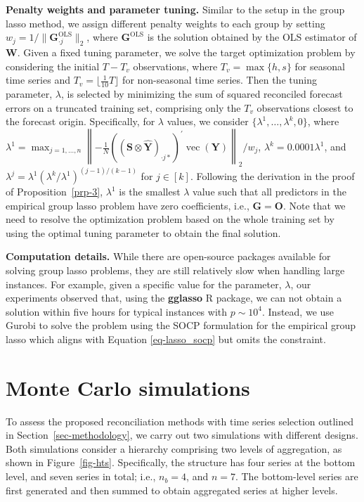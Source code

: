 \documentclass[
  11pt]{article}
\theoremstyle{plain}
\theoremstyle{remark}
\begin{document}
\textbf{Penalty weights and parameter tuning.} Similar to the setup in
the group lasso method, we assign different penalty weights to each
group by setting \(w_j = 1/\|\bm{G}_{\cdot j}^{\text{OLS}}\|_2\), where
\(\bm{G}^{\text{OLS}}\) is the solution obtained by the OLS estimator of
\(\bm{W}\). Given a fixed tuning parameter, we solve the target
optimization problem by considering the initial \(T-T_v\) observations,
where \(T_v = \max\{h, s\}\) for seasonal time series and
\(T_v = \lfloor \frac{1}{10}T \rfloor\) for non-seasonal time series.
Then the tuning parameter, \(\lambda\), is selected by minimizing the
sum of squared reconciled forecast errors on a truncated training set,
comprising only the \(T_v\) observations closest to the forecast origin.
Specifically, for \(\lambda\) values, we consider
\(\{\lambda^{1},\dots,\lambda^{k}, 0\}\), where
\(\lambda^{1} = \max_{j=1, \ldots, n}\left\|-\frac{1}{N}\left(\left(\bm{S} \otimes \hat{\bm{Y}}\right)_{\cdot j*}\right)^{\prime} \operatorname{vec}(\bm{Y})\right\|_2 / w_j\),
\(\lambda^{k} = 0.0001\lambda^{1}\), and
\(\lambda^{j} = \lambda^{1}\left(\lambda^{k} / \lambda^{1}\right)^{(j-1) / (k-1)}\)
for \(j \in [k]\). Following the derivation in the proof of
Proposition~\ref{prp-3}, \(\lambda^{1}\) is the smallest \(\lambda\)
value such that all predictors in the empirical group lasso problem have
zero coefficients, i.e., \(\bm{G} = \bm{O}\). Note that we need to
resolve the optimization problem based on the whole training set by
using the optimal tuning parameter to obtain the final solution.

\textbf{Computation details.} While there are open-source packages
available for solving group lasso problems, they are still relatively
slow when handling large instances. For example, given a specific value
for the parameter, \(\lambda\), our experiments observed that, using the
\textbf{gglasso} R package, we can not obtain a solution within five
hours for typical instances with \(p \sim 10^4\). Instead, we use Gurobi
to solve the problem using the SOCP formulation for the empirical group
lasso which aligns with Equation \eqref{eq-lasso_socp} but omits the
constraint.

\section{Monte Carlo simulations}\label{sec-simulations}

To assess the proposed reconciliation methods with time series selection
outlined in Section~\ref{sec-methodology}, we carry out two simulations
with different designs. Both simulations consider a hierarchy comprising
two levels of aggregation, as shown in Figure~\ref{fig-hts}.
Specifically, the structure has four series at the bottom level, and
seven series in total; i.e., \(n_b = 4\), and \(n = 7\). The
bottom-level series are first generated and then summed to obtain
aggregated series at higher levels.
\end{document}
